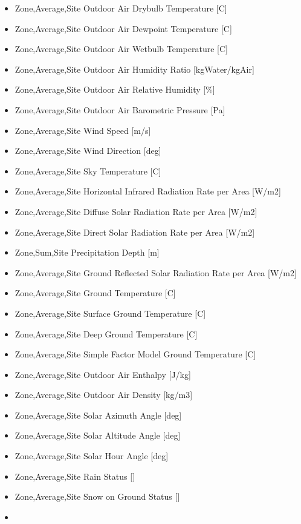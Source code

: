 \begin{itemize}
\item
  Zone,Average,Site Outdoor Air Drybulb Temperature {[}C{]}
\item
  Zone,Average,Site Outdoor Air Dewpoint Temperature {[}C{]}
\item
  Zone,Average,Site Outdoor Air Wetbulb Temperature {[}C{]}
\item
  Zone,Average,Site Outdoor Air Humidity Ratio {[}kgWater/kgAir{]}
\item
  Zone,Average,Site Outdoor Air Relative Humidity {[}\%{]}
\item
  Zone,Average,Site Outdoor Air Barometric Pressure {[}Pa{]}
\item
  Zone,Average,Site Wind Speed {[}m/s{]}
\item
  Zone,Average,Site Wind Direction {[}deg{]}
\item
  Zone,Average,Site Sky Temperature {[}C{]}
\item
  Zone,Average,Site Horizontal Infrared Radiation Rate per Area {[}W/m2{]}
\item
  Zone,Average,Site Diffuse Solar Radiation Rate per Area {[}W/m2{]}
\item
  Zone,Average,Site Direct Solar Radiation Rate per Area {[}W/m2{]}
\item
  Zone,Sum,Site Precipitation Depth {[}m{]}
\item
  Zone,Average,Site Ground Reflected Solar Radiation Rate per Area {[}W/m2{]}
\item
  Zone,Average,Site Ground Temperature {[}C{]}
\item
  Zone,Average,Site Surface Ground Temperature {[}C{]}
\item
  Zone,Average,Site Deep Ground Temperature {[}C{]}
\item
  Zone,Average,Site Simple Factor Model Ground Temperature {[}C{]}
\item
  Zone,Average,Site Outdoor Air Enthalpy {[}J/kg{]}
\item
  Zone,Average,Site Outdoor Air Density {[}kg/m3{]}
\item
  Zone,Average,Site Solar Azimuth Angle {[}deg{]}
\item
  Zone,Average,Site Solar Altitude Angle {[}deg{]}
\item
  Zone,Average,Site Solar Hour Angle {[}deg{]}
\item
  Zone,Average,Site Rain Status {[]}
\item
  Zone,Average,Site Snow on Ground Status {[]}
\item

\end{itemize}
